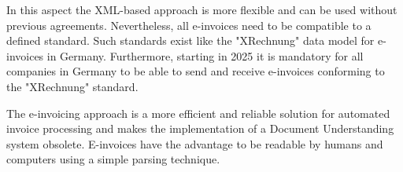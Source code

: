 In this aspect the XML-based approach is more flexible and can be used without previous agreements. Nevertheless, all e-invoices need to be compatible to a defined standard. Such standards exist like the "XRechnung" data model for e-invoices in Germany. Furthermore, starting in 2025 it is mandatory for all companies in Germany to be able to send and receive e-invoices conforming to the "XRechnung" standard. \cite{XRechnung}

The e-invoicing approach is a more efficient and reliable solution for automated invoice processing and makes the implementation of a Document Understanding system obsolete. E-invoices have the advantage to be readable by humans and computers using a simple parsing technique.
\cite{alt2002integrierte,au2001should}